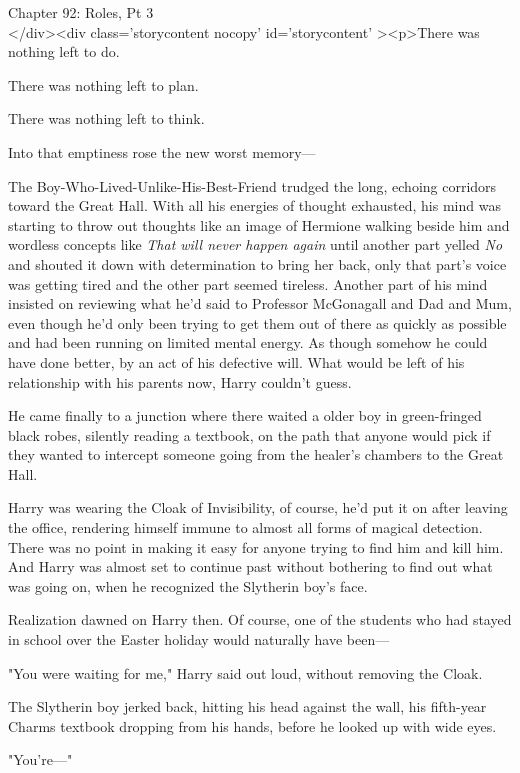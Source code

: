
Chapter 92: Roles, Pt 3\\
</div><div  class='storycontent nocopy' id='storycontent' ><p>There was nothing 
left to do.

There was nothing left to plan.

There was nothing left to think.

Into that emptiness rose the new worst memory---

The Boy-Who-Lived-Unlike-His-Best-Friend trudged the long, echoing corridors 
toward the Great Hall. With all his energies of thought exhausted, his mind was 
starting to throw out thoughts like an image of Hermione walking beside him and 
wordless concepts like \emph{That will never happen again} until another part 
yelled \emph{No} and shouted it down with determination to bring her back, only 
that part's voice was getting tired and the other part seemed tireless. Another 
part of his mind insisted on reviewing what he'd said to Professor McGonagall 
and Dad and Mum, even though he'd only been trying to get them out of there as 
quickly as possible and had been running on limited mental energy. As though 
somehow he could have done better, by an act of his defective will. What would 
be left of his relationship with his parents now, Harry couldn't guess.

He came finally to a junction where there waited a older boy in green-fringed 
black robes, silently reading a textbook, on the path that anyone would pick if 
they wanted to intercept someone going from the healer's chambers to the Great 
Hall.

Harry was wearing the Cloak of Invisibility, of course, he'd put it on after 
leaving the office, rendering himself immune to almost all forms of magical 
detection. There was no point in making it easy for anyone trying to find him 
and kill him. And Harry was almost set to continue past without bothering to 
find out what was going on, when he recognized the Slytherin boy's face.

Realization dawned on Harry then. Of course, one of the students who had stayed 
in school over the Easter holiday would naturally have been---

"You were waiting for me," Harry said out loud, without removing the Cloak.

The Slytherin boy jerked back, hitting his head against the wall, his 
fifth-year Charms textbook dropping from his hands, before he looked up with 
wide eyes.

"You're---"

